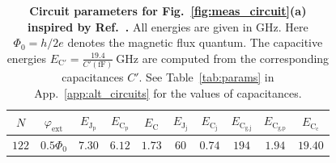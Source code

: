 \documentclass[%
reprint,
superscriptaddress,
 amsmath,amssymb,
 aps,
 prx,
longbibliography,
floatfix,
]{revtex4-2}
\begin{document}
\renewcommand{\arraystretch}{1.5} %
\begin{table}[htb]
\centering
\begin{tabular}{|c|c|c|c|c|c|c|c|c|c|}
    \hline
     $N$ & $\varphi_{\textrm{ext}}$ & $E_{\textrm{J}_\textrm{p}}$ & $E_{\textrm{C}_\textrm{p}}$ & $E_{\textrm{C}}$ & $E_{\textrm{J}_\textrm{j}}$ & $E_{\textrm{C}_\textrm{j}}$ & $E_{\textrm{C}_\textrm{g,j}}$ & $E_{\textrm{C}_\textrm{g,p}}$ & $E_{\textrm{C}_\textrm{c}}$ \\
    \hline
    $122$ & $0.5\Phi_0$ & $7.30$ & $6.12$ & $1.73$ & $60$ & $0.74$ & $194$ & $1.94$ & $19.40$ \\
    \hline
\end{tabular}
\caption{{\bf Circuit parameters for Fig.~\ref{fig:meas_circuit}(a) inspired by Ref.~\cite{zhang_universal_2021}.} All energies are given in GHz. Here $\Phi_0=h/2e$ denotes the magnetic flux quantum. The capacitive energies $E_{\textrm{C}'}=\frac{19.4}{{C'}(\mathrm{fF})} \ \mathrm{GHz}$ are computed from the corresponding capacitances $C'$. See Table~\ref{tab:params} in App.~\ref{app:alt_circuits} for the values of capacitances.}
\label{tab:circuit_params}
\end{table}







\renewcommand{\arraystretch}{1.5} %
\end{document}

